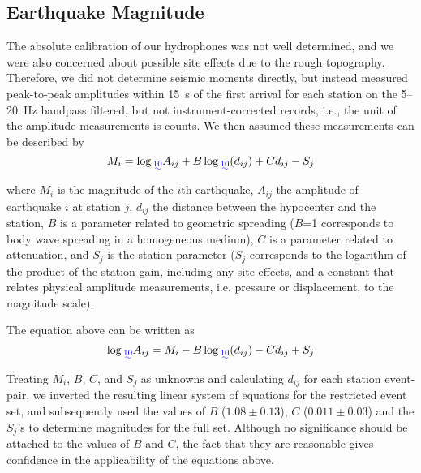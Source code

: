 \documentclass[jgrga]{agu2001} %
\newlength{\tw}
\providecommand{\DIFadd}[1]{{\protect\color{blue}\uwave{#1}}} %
\providecommand{\DIFaddbegin}{} %
\providecommand{\DIFaddend}{} %
\begin{document}
\begin{article}
\section{Earthquake Magnitude}

The absolute calibration of our hydrophones was not well determined,
and we were also concerned about possible site effects due to
the rough topography.  Therefore, we did not determine seismic moments
directly, but instead measured peak-to-peak amplitudes within 15~s of
the first arrival for each station on the 5--20~Hz bandpass filtered,
but not instrument-corrected
records, i.e., the unit of the amplitude measurements is counts.
  We then assumed these measurements
can be described by \citep[modified from][]{hutton87}
\begin{equation}
M_i=\log\DIFaddbegin \DIFadd{_{10} }\DIFaddend A_{ij} + B \log\DIFaddbegin \DIFadd{_{10}}\DIFaddend (d_{ij}) + C d_{ij} - S_{j}
\end{equation}
where $M_i$ is the magnitude of the $i$th earthquake, $A_{ij}$ the
amplitude of earthquake $i$ at station $j$, $d_{ij}$ the distance
between the hypocenter and the station, $B$ is a parameter related to
geometric spreading ($B$=1 corresponds to body wave spreading in a
homogeneous medium), $C$ is a parameter related to attenuation, and
$S_{j}$ is the station parameter ($S_{j}$ corresponds to the logarithm
of the product of the station gain, including any site effects, and a
constant that relates physical amplitude measurements, i.e. pressure
or displacement, to the magnitude scale).

The equation above can be written as 
\begin{equation}
\log\DIFaddbegin \DIFadd{_{10} }\DIFaddend A_{ij}= M_i - B \log\DIFaddbegin \DIFadd{_{10}}\DIFaddend (d_{ij}) - C d_{ij} + S_{j}
\end{equation}
Treating $M_i$, $B$, $C$, and $S_j$ as unknowns and calculating
$d_{ij}$ for each station event-pair, we inverted the resulting linear
system of equations for the restricted event set, and subsequently
used the values of $B$ ($1.08 \pm 0.13$), $C$ ($0.011\pm0.03$) and the
$S_{j}$'s to determine magnitudes for the full set.   
Although no significance should be attached to the values of $B$ and
$C$, the fact that they are reasonable gives confidence in the
applicability of the equations above.


\end{article}
\end{document}
